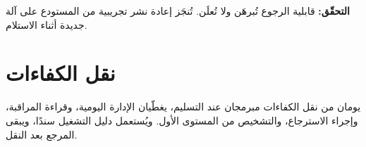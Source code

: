 \begin{encadre}
\textbf{التحقّق:} قابلية الرجوع تُبرهَن ولا تُعلَن. تُنجَز إعادة نشر تجريبية من
المستودع على آلة جديدة أثناء الاستلام.
\end{encadre}

\section{نقل الكفاءات}
يومان من نقل الكفاءات مبرمجان عند التسليم، يغطّيان الإدارة اليومية، وقراءة
المراقبة، وإجراء الاسترجاع، والتشخيص من المستوى الأول. ويُستعمل دليل التشغيل
سندًا، ويبقى المرجع بعد النقل.
